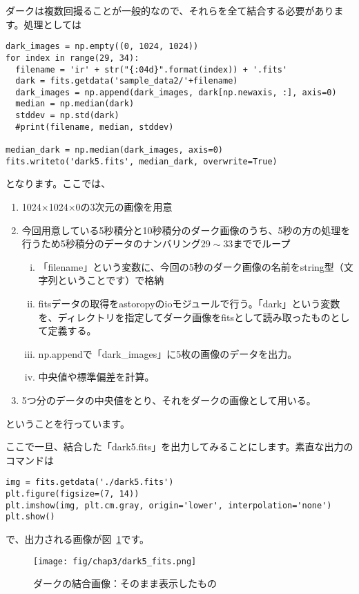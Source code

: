 ダークは複数回撮ることが一般的なので、それらを全て結合する必要があります。処理としては
\begin{lstlisting}[caption=ダーク画像の結合,label=code_3_3_2]
dark_images = np.empty((0, 1024, 1024))
for index in range(29, 34):
  filename = 'ir' + str("{:04d}".format(index)) + '.fits'
  dark = fits.getdata('sample_data2/'+filename)
  dark_images = np.append(dark_images, dark[np.newaxis, :], axis=0)
  median = np.median(dark)
  stddev = np.std(dark)
  #print(filename, median, stddev)

median_dark = np.median(dark_images, axis=0)
fits.writeto('dark5.fits', median_dark, overwrite=True)
\end{lstlisting}
となります。ここでは、
\begin{enumerate}[(1)]
  \item 1024$\times$1024$\times$0の3次元の画像を用意
  \item 今回用意している5秒積分と10秒積分のダーク画像のうち、5秒の方の処理を行うため5秒積分のデータのナンバリング$29\sim33$まででループ
  \begin{enumerate}[(i)]
    \item 「filename」という変数に、今回の5秒のダーク画像の名前をstring型（文字列ということです）で格納
    \item fitsデータの取得をastoropyのioモジュールで行う。「dark」という変数を、ディレクトリを指定してダーク画像をfitsとして読み取ったものとして定義する。
    \item np.appendで「dark\_images」に5枚の画像のデータを出力。
    \item 中央値や標準偏差を計算。
  \end{enumerate}
  \item 5つ分のデータの中央値をとり、それをダークの画像として用いる。
\end{enumerate}
ということを行っています。

ここで一旦、結合した「dark5.fits」を出力してみることにします。素直な出力のコマンドは
\begin{lstlisting}[caption=ダーク画像の出力,label=code_3_3_3]
img = fits.getdata('./dark5.fits')
plt.figure(figsize=(7, 14))
plt.imshow(img, plt.cm.gray, origin='lower', interpolation='none')
plt.show()
\end{lstlisting}
で、出力される画像が図~\ref{fig_3_1}です。
\begin{figure}
  \centering
	\texttt{[image: fig/chap3/dark5\_fits.png]}
	\caption[ダークの結合画像：そのまま表示したもの]{ダークの結合画像：そのまま表示したもの\label{fig_3_1}}
\end{figure}

